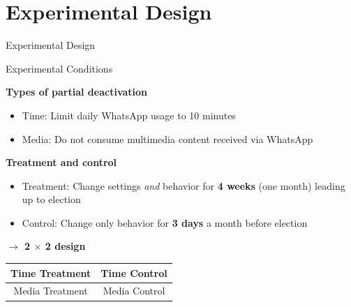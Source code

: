 \documentclass[usenames,dvipsnames,t]{beamer}
\begin{document}
\section{Experimental Design}


\begin{frame}[plain]
\vspace{3cm}
\centering
\LARGE 
Experimental Design
\end{frame}

\begin{frame}{Experimental Conditions} \small  

{\bf \color{yblue} Types of partial deactivation}
\begin{itemize}
\item Time: Limit daily WhatsApp usage to 10 minutes 
\item Media: Do not consume multimedia content received via WhatsApp
\end{itemize}

\vspace{.5cm}\pause


{\bf \color{yblue} Treatment and control}
\begin{itemize}
\item Treatment: Change {settings \textit{and} behavior} for \textbf{4 weeks} (one month) leading up to election
\item Control: Change only {behavior} for \textbf{3 days} a month before election
\end{itemize}

\vspace{.5cm}\pause


{\bf \color{yblue} $\rightarrow$ 2 $\times$ 2 design}

\begin{table}[]
\begin{tabular}{|c|c|}
\hline Time Treatment & Time Control \\ \hline Media Treatment & Media Control \\ \hline
\end{tabular}
\end{table}


\end{frame}
\end{document}
